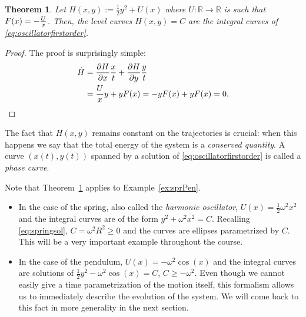 \documentclass[english,fontsize=11pt,paper=a5,oneside]{scrbook}
\newcommand{\R}{\mathbb{R}}
\let\d\relax
\newcommand{\d}{\mathrm{d}}
\newtheorem{theorem}{Theorem}[chapter]
\theoremstyle{definition}
\newenvironment{example}
  {\pushQED{\qed}\renewcommand{\qedsymbol}{$\lozenge$}\examplex}
  {\popQED\endexamplex}
\begin{document}
\begin{theorem}\label{thm:ham1}
  Let $H(x, y) := \frac12 y^2 + U(x)$ where $U:\R\to\R$ is such that $F(x) = -\frac{\d U}{\d x}$.
  Then, the level curves $H(x,y) = C$ are the integral curves of \eqref{eq:oscillatorfirstorder}.
\end{theorem}
\begin{proof}
  The proof is surprisingly simple:
  \begin{align*}
    \dot H & = \frac{\partial H}{\partial x}\frac{\d x}{\d t} + \frac{\partial H}{\partial y}\frac{\d y}{\d t} \\
           & = \frac{\d U}{\d x} y + y F(x)
    = -y F(x) + y F(x) = 0.
  \end{align*}
\end{proof}

The fact that $H(x,y)$ remains constant on the trajectories is crucial: when this happens we say that the total energy of the system is a \emph{conserved quantity}.
A curve $(x(t), y(t))$ spanned by a solution of \eqref{eq:oscillatorfirstorder} is called a \emph{phase curve}.

\begin{example}
  Note that Theorem~\ref{thm:ham1} applies to Example~\ref{ex:sprPen}.
  \begin{itemize}
    \item In the case of the spring, also called the \emph{harmonic oscillator}, $U(x) = \frac12 \omega^2 x^2$ and the integral curves are of the form $y^2 + \omega^2 x^2 = C$.
          Recalling \eqref{eq:springsol}, $C = \omega^2 R^2 \geq 0$ and the curves are ellipses parametrized by $C$.
          This will be a very important example throughout the course.
    \item In the case of the pendulum, $U(x) = -\omega^2 \cos(x)$ and the integral curves are solutions of $\frac12 y^2 - \omega^2 \cos(x) = C$, $C \geq -\omega^2$.
          Even though we cannot easily give a time parametrization of the motion itself, this formalism allows us to immediately describe the evolution of the system.
          We will come back to this fact in more generality in the next section.
  \end{itemize}
\end{example}
\end{document}
